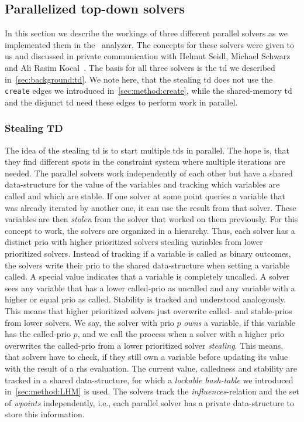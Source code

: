   \subsection{Parallelized top-down solvers}
  \label{sec:method:td_parallel}
  In this section we describe the workings of three different parallel solvers as we implemented them in the \gob\ analyzer. The concepts for these solvers were given to us and discussed in private communication with Helmut Seidl, Michael Schwarz and Ali Rasim Kocal~\cite{privCom}. The basis for all three solvers is the \ac{td} we described in~\autoref{sec:background:td}. We note here, that the stealing \ac{td} does not use the \texttt{create} edges we introduced in~\autoref{sec:method:create}, while the shared-memory \ac{td} and the disjunct \ac{td} need these edges to perform work in parallel.

    \subsubsection{Stealing TD}
    \label{sec:method:td_parallel:stealing}
    The idea of the stealing \ac{td} is to start multiple \acp{td} in parallel. The hope is, that they find different spots in the constraint system where multiple iterations are needed. The parallel solvers work independently of each other but have a shared data-structure for the value of the variables and tracking which variables are called and which are stable. If one solver at some point queries a variable that was already iterated by another one, it can use the result from that solver. These variables are then \textit{stolen} from the solver that worked on them previously.
    For this concept to work, the solvers are organized in a hierarchy. Thus, each solver has a distinct \ac{prio} with higher prioritized solvers stealing variables from lower prioritized solvers. Instead of tracking if a variable is called as binary outcomes, the solvers write their \ac{prio} to the shared data-structure when setting a variable called. A special value indicates that a variable is completely uncalled. A solver sees any variable that has a lower called-\ac{prio} as uncalled and any variable with a higher or equal \ac{prio} as called. Stability is tracked and understood analogously. This means that higher prioritized solvers just overwrite called- and stable-\acp{prio} from lower solvers. 
    We say, the solver with prio $p$ \textit{owns} a variable, if this variable has the called-\ac{prio} $p$, and we call the process when a solver with a higher \ac{prio} overwrites the called-\ac{prio} from a lower prioritized solver \textit{stealing}. This means, that solvers have to check, if they still own a variable before updating its value with the result of a \ac{rhs} evaluation.
    The current value, calledness and stability are tracked in a shared data-structure, for which a \textit{lockable hash-table} we introduced in~\autoref{sec:method:LHM} is used. The solvers track the \textit{influences}-relation and the set of \textit{wpoints} independently, i.e., each parallel solver has a private data-structure to store this information.

